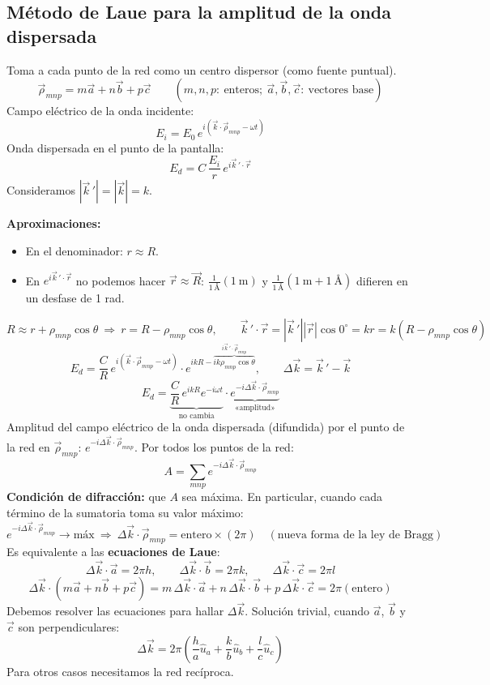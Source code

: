 \documentclass[11pt,a4paper]{article}
\begin{document}
\subsection{Método de Laue para la amplitud de la onda dispersada}
Toma a cada punto de la red como un centro dispersor (como fuente puntual).
\[
\vec\rho_{mnp}=m\vec a+n\vec b+p\vec c\qquad(m,n,p:\ \text{enteros};\ \vec a,\vec b,\vec c:\ \text{vectores base})
\]
Campo eléctrico de la onda incidente:
\[
E_i=E_0\,e^{i(\vec k\cdot\vec\rho_{mnp}-\omega t)}
\]
Onda dispersada en el punto de la pantalla:
\[
E_d=C\,\frac{E_i}{r}\,e^{i\vec k\,'\cdot\vec r}
\]
Consideramos $|\vec k\,'|=|\vec k|=k$.

\textbf{Aproximaciones:}
\begin{itemize}
  \item En el denominador: $r\approx R$.
  \item En $e^{i\vec k\,'\cdot\vec r}$ no podemos hacer $\vec r\approx\vec R$: $\frac{1}{1\,\text{Å}}(1\ \text{m})$ y
        $\frac{1}{1\,\text{Å}}(1\ \text{m}+1\ \text{Å})$ difieren en un desfase de 1 rad.
\end{itemize}
\[
R\approx r+\rho_{mnp}\cos\theta\ \Rightarrow\ r=R-\rho_{mnp}\cos\theta,\qquad
\vec k\,'\cdot\vec r=|\vec k\,'||\vec r|\cos0^\circ=kr=k(R-\rho_{mnp}\cos\theta)
\]
\[
E_d=\frac CR\,e^{i(\vec k\cdot\vec\rho_{mnp}-\omega t)}\cdot e^{ikR-\overbrace{ik\rho_{mnp}\cos\theta}^{i\vec k\,'\cdot\vec\rho_{mnp}}},
\qquad \Delta\vec k=\vec k\,'-\vec k
\]
\[
E_d=\underbrace{\frac CR\,e^{ikR}e^{-i\omega t}}_{\text{no cambia}}\cdot\underbrace{e^{-i\Delta\vec k\cdot\vec\rho_{mnp}}}_{\text{«amplitud»}}
\]
Amplitud del campo eléctrico de la onda dispersada (difundida) por el punto de la red en $\vec\rho_{mnp}$:
$e^{-i\Delta\vec k\cdot\vec\rho_{mnp}}$. Por todos los puntos de la red:
\[
A=\sum_{mnp}e^{-i\Delta\vec k\cdot\vec\rho_{mnp}}
\]
\textbf{Condición de difracción:} que $A$ sea máxima. En particular, cuando cada término de la sumatoria toma su valor máximo:
\[
e^{-i\Delta\vec k\cdot\vec\rho_{mnp}}\rightarrow\text{máx}\ \Rightarrow\
\boxed{\Delta\vec k\cdot\vec\rho_{mnp}=\text{entero}\times(2\pi)}\quad(\text{nueva forma de la ley de Bragg})
\]
Es equivalente a las \textbf{ecuaciones de Laue}:
\[
\Delta\vec k\cdot\vec a=2\pi h,\qquad \Delta\vec k\cdot\vec b=2\pi k,\qquad \Delta\vec k\cdot\vec c=2\pi l
\]
\[
\Delta\vec k\cdot(m\vec a+n\vec b+p\vec c)=m\,\Delta\vec k\cdot\vec a+n\,\Delta\vec k\cdot\vec b+p\,\Delta\vec k\cdot\vec c=2\pi(\text{entero})
\]
Debemos resolver las ecuaciones para hallar $\Delta\vec k$. Solución trivial, cuando $\vec a$, $\vec b$ y $\vec c$ son perpendiculares:
\[
\Delta\vec k=2\pi\left(\frac ha\hat u_a+\frac kb\hat u_b+\frac lc\hat u_c\right)
\]
Para otros casos necesitamos la red recíproca.
\end{document}

